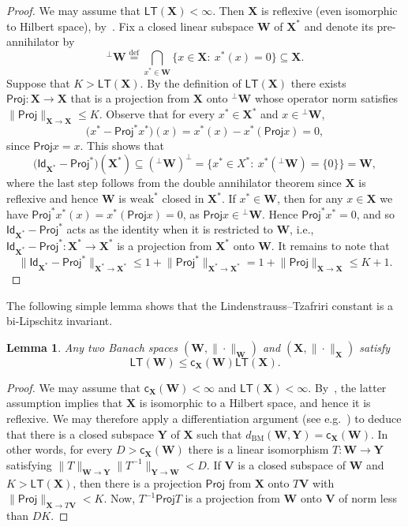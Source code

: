 \documentclass[11pt,reqno]{amsart}
\renewcommand{\le}{\leqslant}
\newcommand{\cc}{\mathsf{c}}
\newcommand{\proj}{\mathsf{Proj}}
\newcommand{\X}{\mathbf X}
\newcommand{\Y}{\mathbf Y}
\newtheorem{lemma}[theorem]{Lemma}
\theoremstyle{remark}
\renewcommand{\subset}{\subseteq}
\newcommand{\eqdef}{\stackrel{\mathrm{def}}{=}}
\newcommand{\BM}{\mathrm{BM}}
\newcommand{\bfW}{\mathbf{W}}
\newcommand{\bfV}{\mathbf{V}}
\renewcommand{\1}{\mathbf 1}
\newcommand{\LT}{\mathsf{LT}}
\begin{document}
\begin{proof} We may assume that $\LT(\X)<\infty$. Then $\X$ is reflexive (even isomorphic to Hilbert space), by~\cite{LT71}. Fix a closed linear subspace $\bfW$ of $\X^*$ and denote its pre-annihilator by $${}^\perp \bfW\eqdef  \bigcap_{x^{*}\in \bfW}\big\{x\in \X:\ x^*(x)=0\big\}\subset \X.$$ Suppose that $K>\LT(\X)$. By the definition of $\LT(\X)$ there exists $\proj:\X\to \X$ that is a projection from $\X$ onto ${}^\perp \bfW$ whose operator norm satisfies $\|\proj\|_{\X\to \X}\le K$. Observe that for every $x^*\in \X^*$ and $x\in {}^\perp \bfW$, $$\big(x^*-\proj^*x^*\big)(x)=x^*(x)-x^*(\proj x)=0,$$
since $\proj x=x$. This shows that
$$\big(\mathsf{Id}_{\X^*}-\proj^*\big)(\X^*)\subset ({}^\perp \bfW)^\perp=\big\{x^*\in X^*:\ x^*({}^\perp \bfW)=\{0\}\big\}=\bfW,$$ where the last step follows from the double annihilator theorem since $\X$ is reflexive and hence $\bfW$ is $\mathrm{weak}^*$ closed in $\X^*$. If $x^*\in \bfW$, then for any $x\in \X$  we have $\proj^*x^*(x)=x^*(\proj x)=0$, as $\proj x\in {}^\perp \bfW$. Hence $\proj^*x^*=0$, and so $\mathsf{Id}_{\X^*}-\proj^*$ acts as the identity when it is restricted to $\bfW$, i.e.,  $\mathsf{Id}_{\X^*}-\proj^*:\X^*\to \X^*$ is a projection from $\X^*$ onto $\bfW$. It remains to note that
\begin{equation*}
\big\|\mathsf{Id}_{\X^*}-\proj^*\big\|_{\X^{\textbf{*}}\to \X^{\textbf{*}}}\le 1+\big\|\proj^*\big\|_{\X^{\textbf{*}}\to \X^{\textbf{*}}}=1+\big\|\proj\big\|_{\X\to \X}\le K+1.\tag*{\qedhere}\end{equation*}
\end{proof}


The following simple lemma shows that the Lindenstrauss--Tzafriri constant is a bi-Lipschitz invariant.

\begin{lemma} Any two Banach spaces $(\bfW,\|\cdot\|_\bfW)$  and $(\X,\|\cdot\|_{\X})$ satisfy
\begin{equation}\label{eq:LT invaraiant}
\LT(\bfW)\le \cc_{\X}(\bfW)\LT(\X).
\end{equation}
\end{lemma}

\begin{proof} We may assume that $\cc_\X(\bfW)<\infty$ and $\LT(\X)<\infty$. By~\cite{LT71}, the latter assumption implies that $\X$ is isomorphic to a Hilbert space, and hence it is reflexive. We may therefore apply a differentiation argument (see e.g.~\cite[Corollary~7.10]{BL00}) to deduce that there is a closed subspace $\Y$ of $\X$ such that $d_\BM(\bfW,\Y)= \cc_\X(\bfW)$. In other words, for every $D>\cc_\X(\bfW)$ there is a linear isomorphism $T:\bfW\to \Y$ satisfying $\|T\|_{\bfW\to \Y}\|T^{-1}\|_{\Y\to \bfW}<D$. If $\bfV$ is a closed subspace of $\bfW$ and $K>\LT(\X)$, then there is a projection $\proj$ from $\X$ onto $T\bfV$ with $\|\proj\|_{\X\to T\bfV}<K$. Now, $T^{-1}\proj T$ is a projection from $\bfW$ onto $\bfV$ of norm less than $DK$.
\end{proof}
\end{document}
